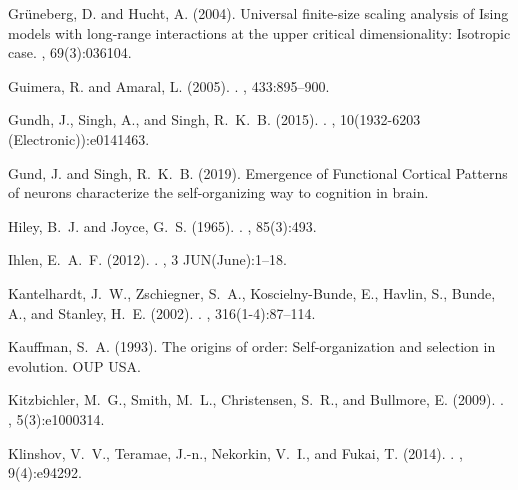 \documentclass[preprintnumbers,amsmath,amssymb,onecolumn]{revtex4}
\begin{document}
\begin{thebibliography}{99}
Gr{\"u}neberg, D. and Hucht, A. (2004).
\newblock Universal finite-size scaling analysis of Ising models with
  long-range interactions at the upper critical dimensionality: Isotropic case.
, 69(3):036104.

Guimera, R. and Amaral, L. (2005).
.
, 433:895--900.

Gundh, J., Singh, A., and Singh, R.~K.~B. (2015).
.
, 10(1932-6203 (Electronic)):e0141463.

 Gund, J. and Singh, R.~K.~B. (2019).
\newblock Emergence of Functional Cortical Patterns of neurons characterize the self-organizing way to cognition in brain.

Hiley, B.~J. and Joyce, G.~S. (1965).
.
, 85(3):493.

Ihlen, E.~A.~F. (2012).
.
, 3 JUN(June):1--18.

Kantelhardt, J.~W., Zschiegner, S.~A., Koscielny-Bunde, E., Havlin, S., Bunde,
  A., and Stanley, H.~E. (2002).
.
, 316(1-4):87--114.

Kauffman, S.~A. (1993).
\newblock The origins of order: Self-organization and selection in evolution. 
\newblock OUP USA.

Kitzbichler, M.~G., Smith, M.~L., Christensen, S.~R., and Bullmore, E. (2009).
.
, 5(3):e1000314.

Klinshov, V.~V., Teramae, J.-n., Nekorkin, V.~I., and Fukai, T. (2014).
.
, 9(4):e94292.


\end{thebibliography}
\end{document}
